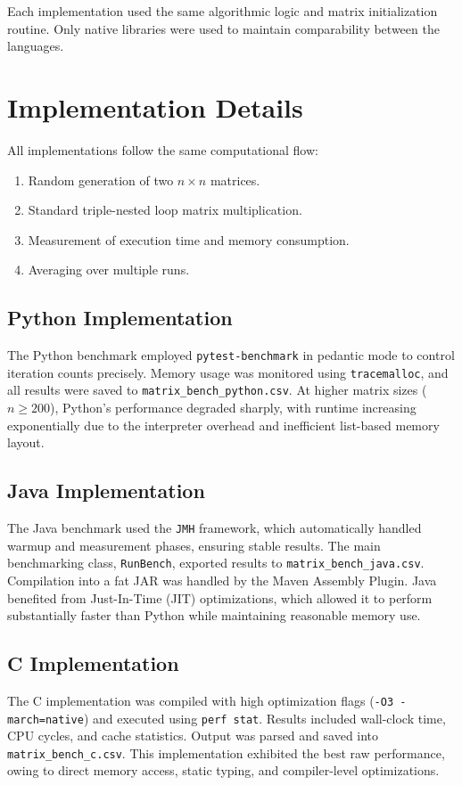 \documentclass[12pt,a4paper]{article}
\begin{document}
Each implementation used the same algorithmic logic and matrix initialization routine. Only native libraries were used to maintain comparability between the languages.

\section{Implementation Details}
All implementations follow the same computational flow:
\begin{enumerate}
  \item Random generation of two $n \times n$ matrices.
  \item Standard triple-nested loop matrix multiplication.
  \item Measurement of execution time and memory consumption.
  \item Averaging over multiple runs.
\end{enumerate}

\subsection{Python Implementation}
The Python benchmark employed \texttt{pytest-benchmark} in pedantic mode to control iteration counts precisely. Memory usage was monitored using \texttt{tracemalloc}, and all results were saved to \texttt{matrix\_bench\_python.csv}.  
At higher matrix sizes ($n \geq 200$), Python’s performance degraded sharply, with runtime increasing exponentially due to the interpreter overhead and inefficient list-based memory layout.

\subsection{Java Implementation}
The Java benchmark used the \texttt{JMH} framework, which automatically handled warmup and measurement phases, ensuring stable results. The main benchmarking class, \texttt{RunBench}, exported results to \texttt{matrix\_bench\_java.csv}. Compilation into a fat JAR was handled by the Maven Assembly Plugin.  
Java benefited from Just-In-Time (JIT) optimizations, which allowed it to perform substantially faster than Python while maintaining reasonable memory use.

\subsection{C Implementation}
The C implementation was compiled with high optimization flags (\texttt{-O3 -march=native}) and executed using \texttt{perf stat}. Results included wall-clock time, CPU cycles, and cache statistics. Output was parsed and saved into \texttt{matrix\_bench\_c.csv}.  
This implementation exhibited the best raw performance, owing to direct memory access, static typing, and compiler-level optimizations.
\end{document}

